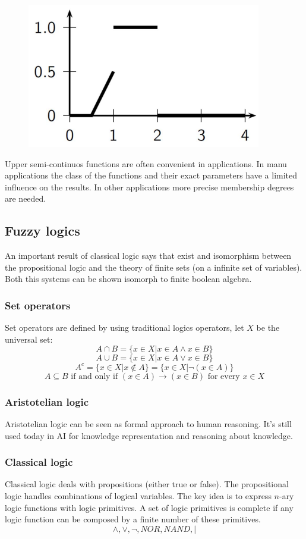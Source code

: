 \documentclass{article}
\begin{document}
\begin{figure}[H]
    \centering
    \includegraphics[scale=0.5]{images/fuzzy-number.png}
\end{figure}
Upper semi-continuos functions are often convenient in applications. In manu applications the class
of the functions and their exact parameters have a limited influence on the results. In other applications
more precise membership degrees are needed.

\subsection{Fuzzy logics}
An important result of classical logic says that exist and isomorphism between the propositional
logic and the theory of finite sets (on a infinite set of variables).
Both this systems can be shown isomorph to finite boolean algebra.

\subsubsection{Set operators}
Set operators are defined by using traditional logics operators, let $X$ be the universal set:
$$A\cap B=\{x\in X| x\in A \land x\in B\}$$
$$A\cup B=\{x\in X| x\in A \lor x\in B\}$$
$$A^c = \{x\in X|x \notin A\} = \{x\in X|\lnot (x\in A)\}$$
$$A\subseteq B\text{ if and only if } (x\in A)\rightarrow(x\in B) \text{ for every } x\in X$$

\subsubsection{Aristotelian logic}
Aristotelian logic can be seen as formal approach to human reasoning. It's still used today in AI for
knowledge representation and reasoning about knowledge.

\subsubsection{Classical logic}
Classical logic deals with propositions (either true or false). The propositional logic handles combinations
of logical variables. The key idea is to express $n$-ary logic functions with logic primitives.
\newline\newline
A set of logic primitives is complete if any logic function can be composed by a finite number of these
primitives.
$$\land,\lor,\lnot,NOR,NAND,|$$
\end{document}
